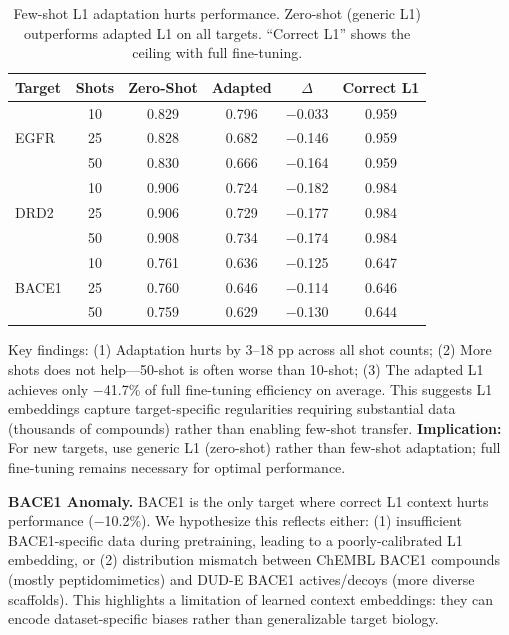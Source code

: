 \documentclass[sigconf,anonymous]{acmart}
\begin{document}
\begin{table}[t]
\caption{Few-shot L1 adaptation hurts performance. Zero-shot (generic L1) outperforms adapted L1 on all targets. ``Correct L1'' shows the ceiling with full fine-tuning.}
\label{tab:fewshot}
\centering
\small
\begin{tabular}{@{}lccccc@{}}
\toprule
Target & Shots & Zero-Shot & Adapted & $\Delta$ & Correct L1 \\
\midrule
\multirow{3}{*}{EGFR} & 10 & 0.829 & 0.796 & $-$0.033 & 0.959 \\
 & 25 & 0.828 & 0.682 & $-$0.146 & 0.959 \\
 & 50 & 0.830 & 0.666 & $-$0.164 & 0.959 \\
\midrule
\multirow{3}{*}{DRD2} & 10 & 0.906 & 0.724 & $-$0.182 & 0.984 \\
 & 25 & 0.906 & 0.729 & $-$0.177 & 0.984 \\
 & 50 & 0.908 & 0.734 & $-$0.174 & 0.984 \\
\midrule
\multirow{3}{*}{BACE1} & 10 & 0.761 & 0.636 & $-$0.125 & 0.647 \\
 & 25 & 0.760 & 0.646 & $-$0.114 & 0.646 \\
 & 50 & 0.759 & 0.629 & $-$0.130 & 0.644 \\
\bottomrule
\end{tabular}
\end{table}

Key findings: (1) Adaptation hurts by 3--18 pp across all shot counts; (2) More shots does not help---50-shot is often worse than 10-shot; (3) The adapted L1 achieves only $-$41.7\% of full fine-tuning efficiency on average. This suggests L1 embeddings capture target-specific regularities requiring substantial data (thousands of compounds) rather than enabling few-shot transfer. \textbf{Implication:} For new targets, use generic L1 (zero-shot) rather than few-shot adaptation; full fine-tuning remains necessary for optimal performance.

\textbf{BACE1 Anomaly.}
BACE1 is the only target where correct L1 context hurts performance ($-$10.2\%). We hypothesize this reflects either: (1) insufficient BACE1-specific data during pretraining, leading to a poorly-calibrated L1 embedding, or (2) distribution mismatch between ChEMBL BACE1 compounds (mostly peptidomimetics) and DUD-E BACE1 actives/decoys (more diverse scaffolds). This highlights a limitation of learned context embeddings: they can encode dataset-specific biases rather than generalizable target biology.
\end{document}
